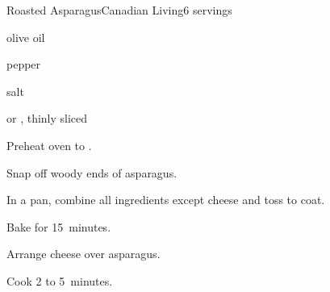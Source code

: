 \begin{recipe}{Roasted Asparagus}{Canadian Living}{6 servings}

\begin{ingredients}
\item {} 
\item {} olive oil
\item \tp{\half} pepper
\item \tp{\quarter} salt
\item {}  or , thinly sliced
\end{ingredients}

\begin{directions}
\item Preheat oven to .
\item Snap off woody ends of asparagus.
\item In a pan, combine all ingredients except cheese and toss to coat.
\item Bake for 15~minutes.
\item Arrange cheese over asparagus.
\item Cook 2 to 5~minutes.  
\end{directions}

\end{recipe}
